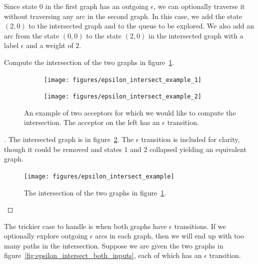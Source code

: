 Since state $0$ in the first graph has an outgoing $\epsilon$, we can
optionally traverse it without traversing any arc in the second graph. In this
case, we add the state $(2, 0)$ to the intersected graph and to the queue to be
explored. We also add an arc from the state $(0, 0)$ to the state $(2, 0)$ in
the intersected graph with a label $\epsilon$ and a weight of $2$.

\begin{example}
Compute the intersection of the two graphs in
figure~\ref{fig:epsilon_intersect_example_inputs}.
\end{example}

\begin{figure}
    \centering
    \begin{subfigure}[b]{0.48\textwidth}
        \centering
        \texttt{[image: figures/epsilon\_intersect\_example\_1]}
    \end{subfigure}
    \begin{subfigure}[b]{0.48\textwidth}
        \centering
        \texttt{[image: figures/epsilon\_intersect\_example\_2]}
    \end{subfigure}
    \caption{An example of two acceptors for which we would like to compute the
    intersection. The acceptor on the left has an $\epsilon$ transition.}
    \label{fig:epsilon_intersect_example_inputs}
\end{figure}

\begin{proof}[\unskip\nopunct]
The intersected graph is in figure~\ref{fig:epsilon_intersect_example}. The
$\epsilon$ transition is included for clarity, though it could be removed
and states $1$ and $2$ collapsed yielding an equivalent graph.

\begin{figure}
    \centering
    \texttt{[image: figures/epsilon\_intersect\_example]}
    \caption{The intersection of the two graphs in
    figure~\ref{fig:epsilon_intersect_example_inputs}.}
    \label{fig:epsilon_intersect_example}
\end{figure}

\end{proof}

The trickier case to handle is when both graphs have $\epsilon$ transitions. If
we optionally explore outgoing $\epsilon$ arcs in each graph, then we will end
up with too many paths in the intersection. Suppose we are given the two graphs
in figure~\ref{fig:epsilon_intersect_both_inputs}, each of which has an
$\epsilon$ transition.

